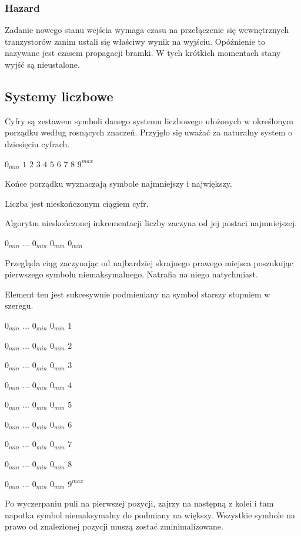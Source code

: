 \documentclass[a4paper,12pt]{article}
\begin{document}
\subsubsection{Hazard}
Zadanie nowego stanu wejścia wymaga czasu na przełączenie się wewnętrznych tranzystorów zanim ustali się właściwy wynik na wyjściu. Opóźnienie to nazywane jest czasem propagacji bramki. W tych krótkich momentach stany wyjść są nieustalone.



\subsection{Systemy liczbowe}

Cyfry są zestawem symboli danego systemu liczbowego ułożonych w określonym porządku według rosnących znaczeń. Przyjęło się uważać za naturalny system o dziesięciu cyfrach.

$0_{min}$ $1$ $2$ $3$ $4$ $5$ $6$ $7$ $8$ $9^{max}$

Końce porządku wyznaczają symbole najmniejszy i największy.

Liczba jest nieskończonym ciągiem cyfr.

Algorytm nieskończonej inkrementacji liczby zaczyna od jej postaci najmniejszej.

$0_{min}$ ... $0_{min}$ $0_{min}$ $0_{min}$

Przegląda ciąg zaczynając od najbardziej skrajnego prawego miejsca poszukując pierwszego symbolu niemaksymalnego. Natrafia na niego natychmiast.

Element ten jest sukcesywnie podmieniany na symbol starszy stopniem w szeregu.

$0_{min}$ ... $0_{min}$ $0_{min}$ $1$

$0_{min}$ ... $0_{min}$ $0_{min}$ $2$

$0_{min}$ ... $0_{min}$ $0_{min}$ $3$

$0_{min}$ ... $0_{min}$ $0_{min}$ $4$

$0_{min}$ ... $0_{min}$ $0_{min}$ $5$

$0_{min}$ ... $0_{min}$ $0_{min}$ $6$

$0_{min}$ ... $0_{min}$ $0_{min}$ $7$

$0_{min}$ ... $0_{min}$ $0_{min}$ $8$

$0_{min}$ ... $0_{min}$ $0_{min}$ $9^{max}$

Po wyczerpaniu puli na pierwszej pozycji, zajrzy na następną z kolei i tam napotka symbol niemaksymalny do podmiany na większy. Wszystkie symbole na prawo od znalezionej pozycji muszą zostać zminimalizowane.
\end{document}
